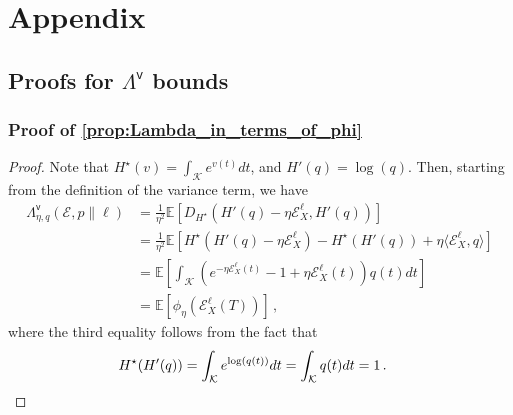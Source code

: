 \documentclass{article}
\theoremstyle{plain}
\theoremstyle{definition}
\theoremstyle{plain}
\newcommand{\E}{\mathbb E}
\newcommand{\K}{\mathcal K}
\newcommand{\cE}{\mathcal E}
\begin{document}
\newpage
\clearpage


\clearpage

\appendix
\section{Appendix}
\label{sec:appendix}

\subsection{Proofs for $\Lambda^{\mathsf{v}}$ bounds}
\subsubsection{Proof of \cref{prop:Lambda_in_terms_of_phi}}
\label{proof:Lambda_in_terms_of_phi}
\begin{proof}
    Note that $H^\star(v) = \int_\K e^{v(t)} dt$, and $H'(q) = \log(q)$.
    Then, starting from the definition of the variance term, we have
    \begin{align}
        \Lambda^{\mathsf{v}}_{\eta, q}(\cE, p \| \ell)
         & =
        \frac{1}{\eta^2}
        \E\left[
            D_{H^\star}\left(
            H'(q) - \eta \cE^\ell_X, H'(q)
            \right)
            \right]
        \\
         & =
        \frac{1}{\eta^2}
        \E\left[
            H^\star(H'(q) - \eta \cE^\ell_X) - H^\star(H'(q)) + \eta \langle \cE^\ell_X, q \rangle
            \right]
        \\
         & =
        \E\left[
            \int_\K \left(e^{-\eta \cE_X^\ell(t)} - 1 + \eta \cE_X^\ell(t)\right) q(t) dt
            \right]
        \\
         & =
        \E\left[
            \phi_\eta(\cE_X^\ell(T))
            \right]
        \,,
    \end{align}
    where the third equality follows from the fact that
    \begin{align}
        H^\star(H'(q)) & = \int_\K e^{\log(q(t))} dt
        = \int_\K q(t) dt = 1\,.\qedhere
    \end{align}
\end{proof}
\end{document}
